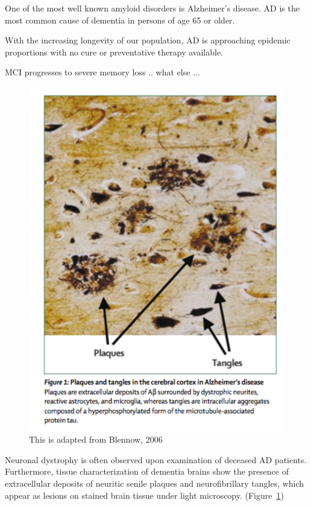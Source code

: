 One of the most well known amyloid disorders is Alzheimer's disease. AD is the most common cause of dementia in persons of age 65 or older. 

With the increasing longevity of our population, AD is approaching epidemic proportions with no cure or preventative therapy available.\cite{Blennow:2006wd}  

MCI progresses to severe memory loss .. what else ...

\begin{figure}
  \centering
  \includegraphics[width=6in]{figures/introduction/AD_tissue_pathology.pdf}
  \caption[Image of lesions formed by plaques and NFTs on brain tissue]{This is adapted from Blennow, 2006}
  \label{fig:AD_tissue_pathology}
\end{figure}

Neuronal dystrophy is often observed upon examination of deceased AD patients. Furthermore, tissue characterization of dementia brains show the presence of extracellular deposits of neuritic senile plaques and neurofibrillary tangles, which appear as lesions on stained brain tissue under light microscopy. (Figure~\ref{fig:AD_tissue_pathology})

